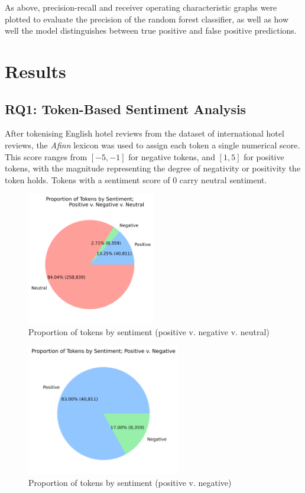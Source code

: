 \documentclass[12pt, bibliography=totocnumbered, a4paper]{scrartcl}
\def\it#1{\textit{#1}}
\begin{document}
As above, precision-recall and receiver operating characteristic
graphs were plotted to evaluate the precision of the random forest
classifier, as well as how well the model distinguishes between true
positive and false positive predictions.

\section{Results}
\subsection{RQ1: Token-Based Sentiment Analysis}
After tokenising English hotel reviews from the dataset of international hotel reviews,
the \it{Afinn} lexicon was used to assign each token a single numerical score. This
score ranges from \([-5, -1]\) for negative tokens, and \([1, 5]\) for positive tokens,
with the magnitude representing the degree of negativity or positivity the token holds.
Tokens with a sentiment score of \(0\) carry neutral sentiment.

\begin{figure}[htpb]
	\begin{center}
		\includegraphics[width=0.5\textwidth]{../results/rq1/pie_tripartite.png}
	\end{center}
	\caption{Proportion of tokens by sentiment (positive v. negative v. neutral)}
	\label{fig:reviews-pie1}
\end{figure}

\begin{figure}[htpb]
	\begin{center}
		\includegraphics[width=0.6\textwidth]{../results/rq1/pie_bipartite.png}
	\end{center}
	\caption{Proportion of tokens by sentiment (positive v. negative)}
	\label{fig:reviews-pie2}
\end{figure}
\end{document}
